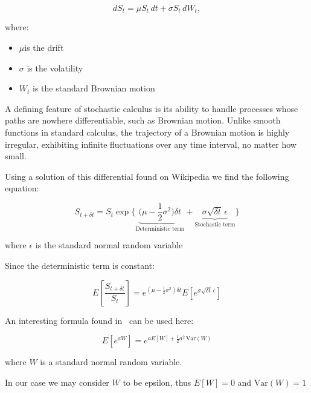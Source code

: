 \documentclass{article}
\begin{document}
    \[dS_t = \mu S_t\, dt + \sigma S_t\, dW_t,\]

    where:
    \begin{itemize}
        \item $\mu$is the drift
        \item $\sigma$ is the volatility
        \item $W_t$ is the standard Brownian motion
    \end{itemize}

    \bigskip

    \begin{tcolorbox}[note, title=Stochastic Calculus]
        A defining feature of stochastic calculus is its ability to handle processes whose paths are nowhere differentiable, such as Brownian motion.
        Unlike smooth functions in standard calculus, the trajectory of a Brownian motion is highly irregular, exhibiting infinite fluctuations over any time interval, no matter how small.
    \end{tcolorbox}

    \bigskip

    Using a solution of this differential found on Wikipedia we find the following equation:

    \[
        S_{t+\delta t} = S_t \exp
        \bigg\{
        \underbrace{\bigg( \mu - \frac{1}{2} \sigma^2 \bigg) \delta t}_{\text{Deterministic term}}
        +
        \underbrace{\sigma \sqrt{\delta t} \, \epsilon}_{\text{Stochastic term}}
        \bigg\}
    \]

    where $\epsilon$ is the standard normal random variable

    \bigskip

    Since the deterministic term is constant:

    \[E\!\left[\frac{S_{t+\delta t}}{S_t}\right] = e^{\left( \mu - \frac{1}{2} \sigma^2 \right) \delta t} E\!\left[e^{\sigma \sqrt{\delta t} \, \epsilon}\right] \]

    \bigskip

    An interesting formula found in~\cite[p.~637]{Ross2010} can be used here:

    \[E\left[e^{aW}\right] = e^{a E[W] + \frac{1}{2} a^2 \, \text{Var}(W)}\]

    where $W$ is a standard normal random variable.

    \bigskip

    In our case we may consider $W$ to be epsilon, thus $E[W] = 0$ and $\text{Var}(W) = 1$
\end{document}
